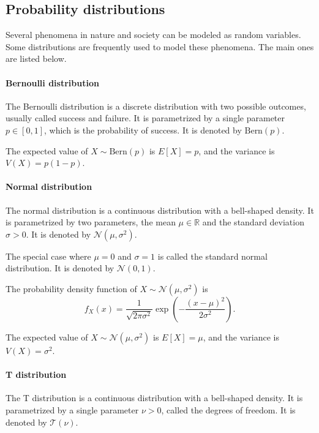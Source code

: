 \subsection{Probability distributions}

Several phenomena in nature and society can be modeled as random variables.  Some
distributions are frequently used to model these phenomena.  The main ones are
listed below.

\paragraph{Bernoulli distribution}  The Bernoulli distribution is a discrete
distribution with two possible outcomes, usually called success and failure.  It is
parametrized by a single parameter $p \in [0, 1]$, which is the probability of
success.  It is denoted by $\text{Bern}(p)$.

The expected value of $X \sim \text{Bern}(p)$ is $E[X] = p$, and the variance is
$V(X) = p(1 - p)$.

\paragraph{Normal distribution} The normal distribution is a continuous distribution
with a bell-shaped density.  It is parametrized by two parameters, the mean $\mu \in
\mathbb{R}$ and the standard deviation $\sigma > 0$.  It is denoted by
$\mathcal{N}(\mu, \sigma^2)$.

The special case where $\mu = 0$ and $\sigma = 1$ is called the standard normal
distribution.  It is denoted by $\mathcal{N}(0, 1)$.

The probability density function of $X \sim \mathcal{N}(\mu, \sigma^2)$ is
\begin{equation}
  \label{eq:normal}
  f_X(x) = \frac{1}{\sqrt{2 \pi \sigma^2}} \exp\left(-\frac{(x - \mu)^2}{2 \sigma^2}\right)\text{.}
\end{equation}

The expected value of $X \sim \mathcal{N}(\mu, \sigma^2)$ is $E[X] = \mu$, and the
variance is $V(X) = \sigma^2$.

\paragraph{T distribution} The T distribution is a continuous distribution with a
bell-shaped density.  It is parametrized by a single parameter $\nu > 0$, called the
degrees of freedom.  It is denoted by $\mathcal{T}(\nu)$.

